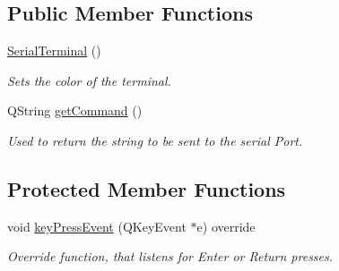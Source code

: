 \subsection*{Public Member Functions}
\begin{DoxyCompactItemize}
\item 
\mbox{\label{classSerialTerminal_a44bef28f4452b91b5cd108c173575ad8}} 
\hyperlink{classSerialTerminal_a44bef28f4452b91b5cd108c173575ad8}{Serial\+Terminal} ()
\begin{DoxyCompactList}\small\item\em Sets the color of the terminal. \end{DoxyCompactList}\item 
Q\+String \hyperlink{classSerialTerminal_a1047c3c8d5502824822a4c95511b8526}{get\+Command} ()
\begin{DoxyCompactList}\small\item\em Used to return the string to be sent to the serial Port. \end{DoxyCompactList}\end{DoxyCompactItemize}
\subsection*{Protected Member Functions}
\begin{DoxyCompactItemize}
\item 
\mbox{\label{classSerialTerminal_ab14904d3ad1af44ee72eb93a0823f446}} 
void \hyperlink{classSerialTerminal_ab14904d3ad1af44ee72eb93a0823f446}{key\+Press\+Event} (Q\+Key\+Event $\ast$e) override
\begin{DoxyCompactList}\small\item\em Override function, that listens for Enter or Return presses. \end{DoxyCompactList}\end{DoxyCompactItemize}

